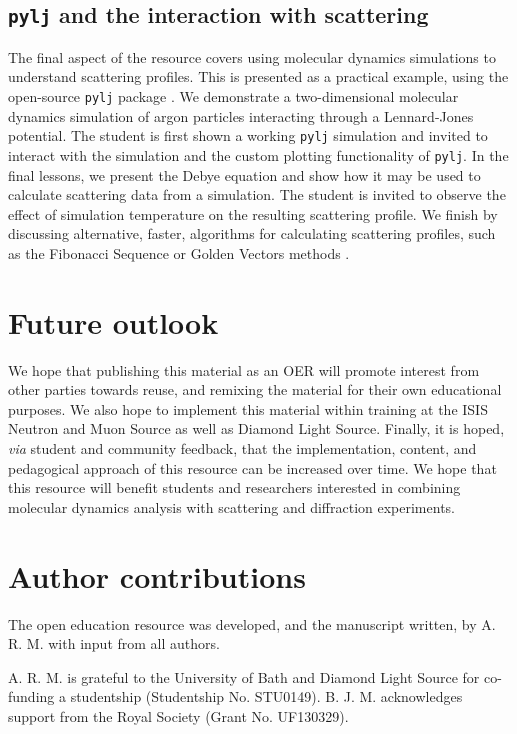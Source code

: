 \documentclass[amsmath,amssymb,twocolumn,superscriptaddress]{revtex4-1}
\begin{document}
\subsection{\texttt{pylj} and the interaction with scattering}

The final aspect of the resource covers using molecular dynamics simulations to understand scattering profiles.
This is presented as a practical example, using the open-source \texttt{pylj} package \cite{mccluskey_pylj_2018}.
We demonstrate a two-dimensional molecular dynamics simulation of argon particles interacting through a Lennard-Jones potential.
The student is first shown a working \texttt{pylj} simulation and invited to interact with the simulation and the custom plotting functionality of \texttt{pylj}.
In the final lessons, we present the Debye equation \cite{debye_zerstreuung_1915} and show how it may be used to calculate scattering data from a simulation.
The student is invited to observe the effect of simulation temperature on the resulting scattering profile.
We finish by discussing alternative, faster, algorithms for calculating scattering profiles, such as the Fibonacci Sequence or Golden Vectors methods \cite{svergun_solution_1994,watson_rapid_2013}.

\section{Future outlook}

We hope that publishing this material as an OER will promote interest from other parties towards reuse, and remixing the material for their own educational purposes.
We also hope to implement this material within training at the ISIS Neutron and Muon Source as well as Diamond Light Source.
Finally, it is hoped, \textit{via} student and community feedback, that the implementation, content, and pedagogical approach of this resource can be increased over time. We hope that this resource will benefit students and researchers interested in combining molecular dynamics analysis with scattering and diffraction experiments.

\section{Author contributions}

The open education resource was developed, and the manuscript written, by A. R. M. with input from all authors.

\begin{acknowledgements}
A. R. M. is grateful to the University of Bath and Diamond Light Source for co-funding a studentship (Studentship No. STU0149).
B. J. M. acknowledges support from the Royal Society (Grant No. UF130329).
\end{acknowledgements}


\end{document}
